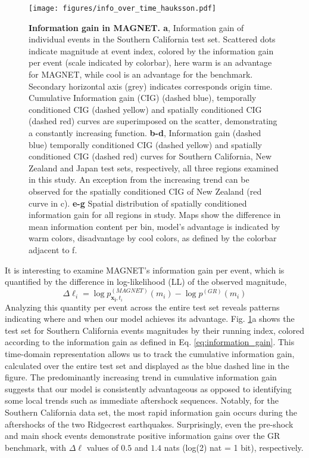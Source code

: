 \documentclass[pdflatex]{sn-jnl}
\begin{document}
    
\begin{figure}[h!]
    \centering
    \texttt{[image: figures/info\_over\_time\_hauksson.pdf]}
    \caption{
        \textbf{Information gain in MAGNET. a}, Information gain of individual events in the Southern California test set. Scattered dots indicate magnitude at event index, colored by the information gain per event (scale indicated by colorbar), here warm is an advantage for MAGNET, while cool is an advantage for the benchmark. Secondary horizontal axis (grey) indicates corresponds origin time. Cumulative Information gain (CIG) (dashed blue), temporally conditioned CIG (dashed yellow) and spatially conditioned CIG (dashed red) curves are superimposed on the scatter, demonstrating a constantly increasing function. \textbf{b-d}, Information gain (dashed blue) temporally conditioned CIG (dashed yellow) and spatially conditioned CIG (dashed red) curves for Southern California, New Zealand and Japan test sets, respectively, all three regions examined in this study. An exception from the increasing trend can be observed for the spatially conditioned CIG of New Zealand (red curve in c). \textbf{e-g} Spatial distribution of spatially conditioned information gain for all regions in study. Maps show the difference in mean information content per bin, model's advantage is indicated by warm colors, disadvantage by cool colors, as defined by the colorbar adjacent to f.
    }
    \label{fig:info_gain_over_time}
\end{figure}
    

It is interesting to examine MAGNET's information gain per event, which is quantified by the difference in log-likelihood (LL) of the observed magnitude, 
\begin{equation}
    \Delta \ell_i = \log{p_{\pmb{x_i}, t_i}^{(MAGNET)}(m_i)} - \log{p^{(GR)}(m_i)}
    \label{eq:information_gain}
\end{equation}
Analyzing this quantity per event across the entire test set reveals patterns indicating where and when our model achieves its advantage. Fig. \ref{fig:info_gain_over_time}a shows the test set for Southern California events magnitudes by their running index, colored according to the information gain as defined in Eq. \ref{eq:information_gain}. This time-domain representation allows us to track the cumulative information gain, calculated over the entire test set and displayed as the blue dashed line in the figure.
The predominantly increasing trend in cumulative information gain suggests that our model is consistently advantageous as opposed to identifying some local trends such as immediate aftershock sequences. Notably, for the Southern California data set, the most rapid information gain occurs during the aftershocks of the two Ridgecrest earthquakes. Surprisingly, even the pre-shock and main shock events demonstrate positive information gains over the GR benchmark, with $\Delta \ell$ values of $0.5$ and $1.4$ nats (log(2) nat = 1 bit), respectively.
\end{document}
